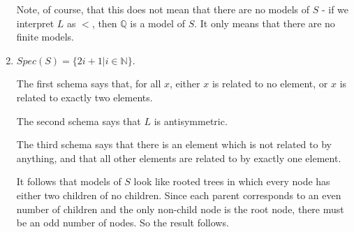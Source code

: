 \begin{mdframed}[linewidth=1]
\begin{enumerate}
   Note, of course, that this does not mean that there are no models of $S$ - if we interpret $L$ as $<$, then $\mathbb{Q}$ is a model of $S$. It only means that there are no finite models. 

    \item $Spec(S) = \{2i + 1 | i \in \mathbb{N}\}$. 

   The first schema says that, for all $x$, either $x$ is related to no element, or $x$ is related to exactly two elements. 

   The second schema says that $L$ is antisymmetric. 

   The third schema says that there is an element which is not related to by anything, and that all other elements are related to by exactly one element.

   It follows that models of $S$ look like rooted trees in which every node has either two children of no children. Since each parent corresponds to an even number of children and the only non-child node is the root node, there must be an odd number of nodes. So the result follows. 
\end{enumerate}
\end{mdframed}